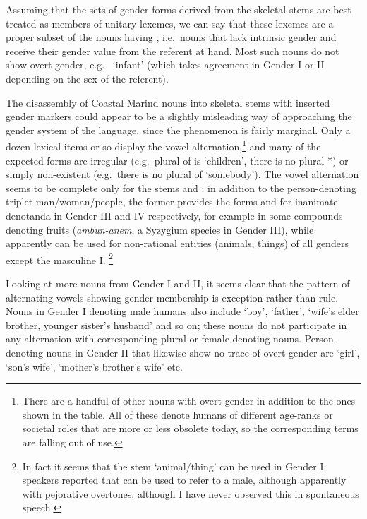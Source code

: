 \documentclass[output=collectionpaper]{langsci/langscibook}
\begin{document}
Assuming that the sets of gender forms derived from the skeletal stems are best treated as members of unitary lexemes, we can say that these lexemes are a proper subset of the nouns having  \citep{Dahl2000a}, i.e.\ nouns that lack intrinsic gender and receive their gender value from the referent at hand. Most such nouns do not show overt gender, e.g.\  `infant' (which takes agreement in Gender I or II depending on the sex of the referent).


The disassembly of Coastal Marind nouns into skeletal stems with inserted gender markers could appear to be a slightly misleading way of approaching the gender system of the language, since the phenomenon is fairly marginal. Only a dozen lexical items or so display the vowel alternation,\footnote{There are a handful of other nouns with overt gender in addition to the ones shown in the table. All of these denote humans of different age-ranks or societal roles that are more or less obsolete today, so the corresponding terms are falling out of use.} and many of the expected forms are irregular (e.g.\ plural of  is  `children', there is no plural *) or simply non-existent (e.g.\ there is no plural of  `somebody'). The vowel alternation seems to be complete only for the stems  and : in addition to the person-denoting triplet man/woman/people, the former provides the forms  and  for inanimate denotanda in Gender III and IV respectively, for example in some compounds denoting fruits (\textit{ambun\hyp{}anem}, a Syzygium species in Gender III), while  apparently can be used for non-rational entities (animals, things) of all genders except the masculine I.%
\footnote{In fact it seems that the stem  `animal/thing' can be used in Gender I: speakers reported that  can be used to refer to a male, although apparently with pejorative overtones, although I have never observed this in spontaneous speech.}


Looking at more nouns from Gender I and II, it seems clear that the pattern of alternating vowels showing gender membership is exception rather than rule. Nouns in Gender I denoting male humans also include  `boy',  `father',  `wife's elder brother, younger sister's husband' and so on; these nouns do not participate in any alternation with corresponding plural or female-denoting nouns. %
Person-denoting nouns in Gender II that likewise show no trace of overt gender are  `girl',  `son's wife',  `mother's brother's wife' etc.
\end{document}

